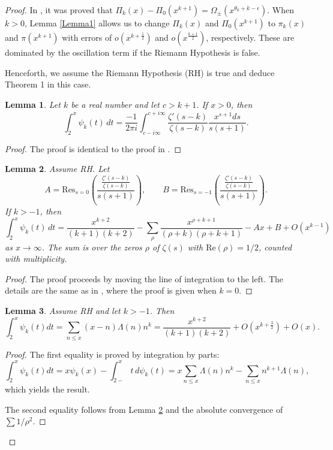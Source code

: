 \documentclass[12pt]{amsart}
\newtheorem{lemma}{Lemma}
\begin{document}
\begin{proof}
In \cite{GW}, it was proved that $\Pi_k(x)-\Pi_0(x^{k+1}) = \Omega_{\pm} (x^{\theta_0 + k -\epsilon})$. When $k>0$, Lemma \ref{Lemma1} allows us to change $\Pi_k(x)$ and $\Pi_0(x^{k+1})$ to $\pi_k(x)$ and $\pi(x^{k+1})$ with errors
of $o(x^{k+\frac12})$ and $o(x^{\frac{k+1}2})$, respectively. These are dominated by the oscillation term if the Riemann Hypothesis is false.  



Henceforth, we assume the Riemann Hypothesis (RH)  is true and deduce Theorem 1 in this case.


\begin{lemma}\label{Lemma2} Let $k$ be a real number and let $c> k+1$. If $x>0$, then
$$
\int_2^x \psi_k(t)\, dt = \frac{-1}{2\pi i} \int_{c-i\infty}^{c+i\infty} \frac{\zeta'(s-k)}{\zeta(s-k)} \frac{x^{s+1} ds}{s(s+1)}.
$$
\end{lemma}
\begin{proof} The proof is identical to the proof in \cite[pp. 31-32]{I}.
\end{proof}
\begin{lemma}\label{Lemma3} Assume RH. Let 
$$
A=\text{Res}_{s=0}\left( \frac{\frac{\zeta'(s-k)}{\zeta(s-k)}}{s(s+1)} \right), \qquad B=\text{Res}_{s=-1}\left( \frac{\frac{\zeta'(s-k)}{\zeta(s-k)}}{s(s+1)} \right).
$$
If $k>-1$, then 
$$
\int_2^{x} \psi_k(t)\, dt = \frac{x^{k+2}}{(k+1)(k+2)} - \sum_{\rho} \frac{x^{\rho+k+1}}{(\rho+k)(\rho+k+1)} -Ax+B+O(x^{k-1})
$$
as $x\to\infty$. The sum is over the zeros $\rho$ of $\zeta(s)$ with $\text{Re}(\rho)=1/2$, counted with multiplicity.
\end{lemma}
\begin{proof}
The proof proceeds by moving the line of integration to the left. The details are the same as in \cite[pp. 73-74]{I}, where the proof is given when $k=0$.
\end{proof}

\begin{lemma}\label{Lemma4} Assume RH and let $k>-1$. Then
$$
\int_2^{x} \psi_k(t)dt = \sum_{n\le x} (x-n)\Lambda(n) n^k = \frac{x^{k+2}}{(k+1)(k+2)} + O(x^{k+\frac32})+ O(x).
$$
\end{lemma}
\begin{proof}
The first equality is proved by integration by parts:
$$
\int_2^x \psi_k(t) dt= x\psi_k(x) - \int_{2-}^x t\, d\psi_k(t)  = x\sum_{n\le x} \Lambda(n) n^k - \sum_{n\le x} n^{k+1} \Lambda(n),
$$
which yields the result. 

The second equality follows from Lemma \ref{Lemma3} and the absolute convergence of $\sum 1/\rho^2$.
\end{proof}



\end{proof}
\end{document}
